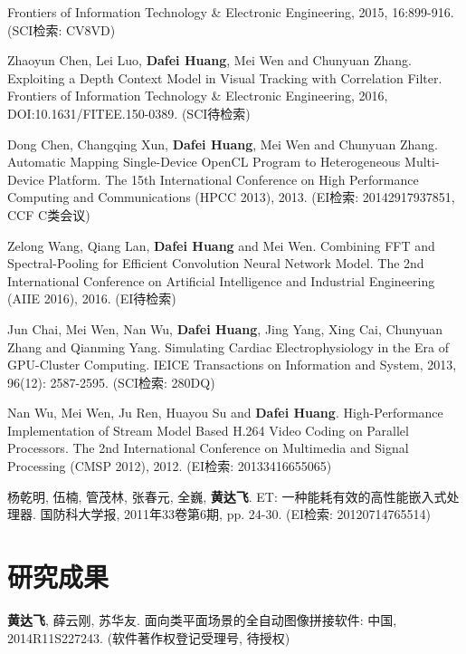 \begin{resume}
\begin{enumerate}[{[}1{]}]
  Frontiers of Information Technology \& Electronic Engineering, 2015, 16:899-916.
  (SCI检索: CV8VD)
  \item Zhaoyun Chen, Lei Luo, \textbf{Dafei Huang}, Mei Wen and Chunyuan Zhang. 
  Exploiting a Depth Context Model in Visual Tracking with Correlation Filter. 
  Frontiers of Information Technology \& Electronic Engineering, 2016, DOI:10.1631/FITEE.150-0389.
  (SCI待检索)
  \item Dong Chen, Changqing Xun, \textbf{Dafei Huang}, Mei Wen and Chunyuan Zhang. 
  Automatic Mapping Single-Device OpenCL Program to Heterogeneous Multi-Device Platform. 
  The 15th International Conference on High Performance Computing and Communications (HPCC 2013), 2013.
  (EI检索: 20142917937851, CCF C类会议)
  \item Zelong Wang, Qiang Lan, \textbf{Dafei Huang} and Mei Wen. 
  Combining FFT and Spectral-Pooling for Efficient Convolution Neural Network Model. 
  The 2nd International Conference on Artificial Intelligence and Industrial Engineering (AIIE 2016), 2016.
  (EI待检索)
  \item Jun Chai, Mei Wen, Nan Wu, \textbf{Dafei Huang}, Jing Yang, Xing Cai, Chunyuan Zhang and Qianming Yang. 
  Simulating Cardiac Electrophysiology in the Era of GPU-Cluster Computing. 
  IEICE Transactions on Information and System, 2013, 96(12): 2587-2595.
  (SCI检索: 280DQ)
  \item Nan Wu, Mei Wen, Ju Ren, Huayou Su and \textbf{Dafei Huang}. 
  High-Performance Implementation of Stream Model Based H.264 Video Coding on Parallel Processors. 
  The 2nd International Conference on Multimedia and Signal Processing (CMSP 2012), 2012.
  (EI检索: 20133416655065)
  \item 杨乾明, 伍楠, 管茂林, 张春元, 全巍, \textbf{黄达飞}. 
  ET: 一种能耗有效的高性能嵌入式处理器. 
  国防科大学报, 2011年33卷第6期, pp. 24-30. 
  (EI检索: 20120714765514)
  \end{enumerate}

  \section*{研究成果} %
  \begin{enumerate}[{[}1{]}]
  \addtolength{\itemsep}{-.36\baselineskip}%
  \item \textbf{黄达飞}, 薛云刚, 苏华友.
  面向类平面场景的全自动图像拼接软件: 
  中国, 2014R11S227243. (软件著作权登记受理号, 待授权)
  \end{enumerate}
\end{resume}
